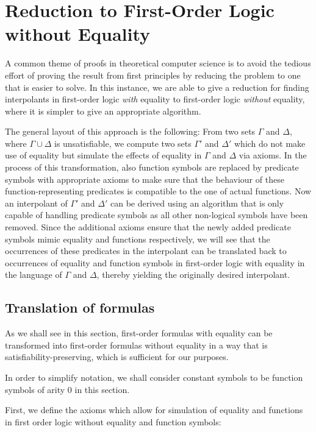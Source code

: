 \chapter{Reduction to First-Order Logic without Equality}

A common theme of proofs in theoretical computer science is to avoid the tedious effort of proving the result from first principles by reducing the problem to one that is easier to solve.
In this instance, we are able to give a reduction for finding interpolants in first-order logic \emph{with} equality to first-order logic \emph{without} equality, where it is simpler to give an appropriate algorithm.

The general layout of this approach is the following:
From two sets $\Gamma$ and $\Delta$, where $\Gamma \cup \Delta$ is unsatisfiable, we compute two sets $\Gamma'$ and $\Delta'$ which do not make use of equality but simulate the effects of equality in $\Gamma$ and $\Delta$ via axioms.
In the process of this transformation, also function symbols are replaced by predicate symbols with appropriate axioms to make sure that the behaviour of these function-representing predicates is compatible to the one of actual functions.
Now an interpolant of $\Gamma'$ and $\Delta'$ can be derived using an algorithm that is only capable of handling predicate symbols as all other non-logical symbols have been removed.
Since the additional axioms ensure that the newly added predicate symbols mimic equality and functions respectively, we will see that the occurrences of these predicates in the interpolant can be translated back to occurrences of equality and function symbols in first-order logic with equality in the language of $\Gamma$ and $\Delta$, thereby yielding the originally desired interpolant.


\section{Translation of formulas}

As we shall see in this section, first-order formulas with equality can be transformed into first-order formulas without equality in a way that is satisfiability-preserving, which is sufficient for our purposes.

In order to simplify notation, we shall consider constant symbols to be function symbols of arity $0$ in this section.

First, we define the axioms which allow for simulation of equality and functions in first order logic without equality and function symbols:

